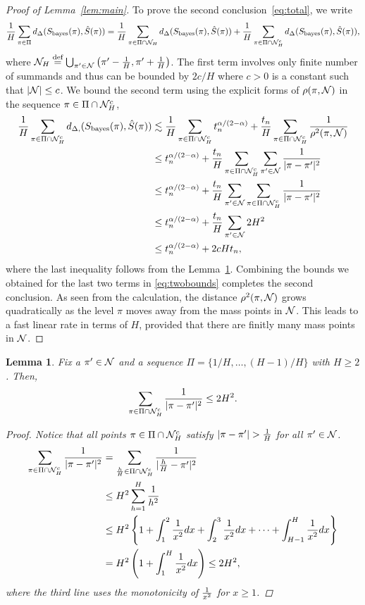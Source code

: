 \documentclass[11pt]{article}
\theoremstyle{plain}
\newtheorem{lem}{Lemma}
\theoremstyle{definition}
\def\bayesS{S_{\textup{bayes}}}
\begin{document}
\begin{proof}[Proof of Lemma~\ref{lem:main}]
To prove the second conclusion~\eqref{eq:total}, we write 
\begin{align}\label{eq:twobounds}
{1\over H}\sum_{\pi \in \Pi} d_{\Delta}(\bayesS(\pi),\hat S(\pi))={1\over H}\sum_{\pi \in \Pi\cap \tN_H} d_{\Delta}(\bayesS(\pi),\hat S(\pi))+{1\over H}\sum_{\pi \in \Pi\cap \tN_H^c} d_{\Delta}(\bayesS(\pi),\hat S(\pi)),
\end{align}
where $\mathcal{N}_H \stackrel{\text{def}}{=}\bigcup_{\pi'\in\mathcal{N}}\left(\pi'-\frac{1}{H},\pi'+\frac{1}{H}\right)$.
The first term involves only finite number of summands and thus can be bounded by $2c/H$ where $c>0$ is a constant such that $|\mathcal{N}|\leq c$.  We bound the second term using the explicit forms of $\rho(\pi, \mathcal{N})$ in the sequence $\pi \in\Pi\cap \mathcal{N}_H^c$,
\begin{align}
{1\over H}\sum_{\pi \in \Pi\cap \tN_H^c} d_{\Delta,}(\bayesS(\pi),\hat S(\pi)) &\lesssim  {1\over H}\sum_{\pi\in \Pi\cap \tN_H^c} t_n^{\alpha/(2-\alpha)}+{t_n\over H}\sum_{\pi \in \Pi\cap \tN_H^c}{1\over \rho^2(\pi, \tN)}\\
&\leq t_n^{\alpha/(2-\alpha)}+{t_n\over H} \sum_{\pi \in \Pi\cap \tN_H^c} \sum_{\pi' \in \tN}{1\over |\pi-\pi'|^2}\\
&\leq  t_n^{\alpha/(2-\alpha)}+{t_n\over H} \sum_{\pi'\in \tN} \sum_{\pi \in \Pi\cap \tN_H^c}{1\over |\pi-\pi'|^2}\\
&\leq t_n^{\alpha/(2-\alpha)}+ {t_n\over H} \sum_{\pi'\in \tN} 2H^2\\
&\leq t_n^{\alpha/(2-\alpha)}+ 2cHt_n,
\end{align}
where the last inequality follows from the Lemma~\ref{lem:H}.  Combining the bounds we obtained for the last two terms in \eqref{eq:twobounds} completes the second conclusion.  As seen from the calculation, the distance $\rho^2(\pi, \mathcal{N})$ grows quadratically as the level $\pi$ moves away from the mass points in $\mathcal{N}$. This leads to a fast linear rate in terms of $H$, provided that there are finitly many mass points in $\mathcal{N}$.
\end{proof}

\begin{lem}\label{lem:H}
Fix a $\pi'\in\mathcal{N}$ and a sequence $\Pi=\{1/H,\ldots,(H-1)/H\}$ with $H\geq 2$. Then, 
\[
\sum_{\pi \in \Pi\cap \mathcal{N}_H^c}{1\over 
|\pi-\pi'|^2}\leq 2H^2. 
\]
\begin{proof}
Notice that  all points $\pi\in\Pi\cap\mathcal{N}_H^c$ satisfy 
$|\pi-\pi'|>{1\over H}$ for all $\pi'\in\mathcal{N}$.
\begin{align}
   \sum_{\pi \in \Pi\cap \mathcal{N}_H^c}{1\over |\pi-\pi'|^2}&= \sum_{\frac{h}{H}\in\Pi\cap \mathcal{N}_H^c } {1\over |\frac{h}{H}-\pi'|^2}\\
   &\leq H^2 \sum_{h=1}^{H}{1 \over h^2}\\
 &\leq H^2\left\{ 1+\int_{1}^2{1\over x^2}dx+ \int_{2}^3{1\over x^2}dx+\cdots + \int_{H-1}^H{1\over x^2}dx\right\}\\
&= H^2\left(1+\int^{H}_{1}{1\over x^2}dx\right) \leq 2H^2,
\end{align}
 where the third line uses the monotonicity of ${1\over x^2}$ for $x\geq 1$. 
 \end{proof}
\end{lem}
\end{document}

